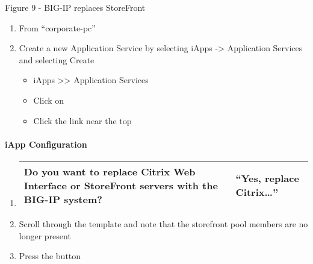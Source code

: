 \documentclass[letterpaper,10pt,english]{sphinxmanual}
\begin{document}
Figure 9 - BIG-IP replaces StoreFront

\begin{enumerate}
\item {} 
From “corporate-pc”

\item {} 
Create a new Application Service by selecting iApps -\textgreater{} Application
Services and selecting Create
\begin{itemize}
\item {} 
iApps \textgreater{}\textgreater{} Application Services

\item {} 
Click on 

\item {} 
Click the  link near the top

\end{itemize}

\end{enumerate}


\paragraph{iApp Configuration}
\label{\detokenize{class2/module2/lab1:id1}}\begin{enumerate}
\item {} 


\begin{savenotes}\sphinxattablestart
\centering
\begin{tabulary}{\linewidth}[t]{|T|T|}
\hline

Do you want to replace Citrix Web Interface or StoreFront servers with the BIG-IP system?
&
“Yes, replace Citrix…”
\\
\hline
\end{tabulary}
\par
\sphinxattableend\end{savenotes}

\item {} 
Scroll through the template and note that the storefront pool members
are no longer present

\item {} 
Press the  button

\end{enumerate}
\end{document}
